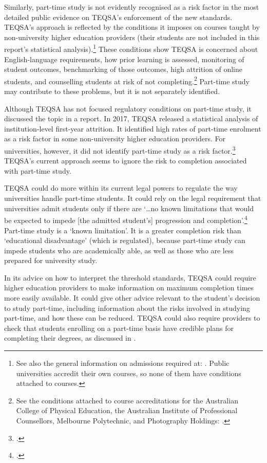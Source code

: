 Similarly, part-time study is not evidently recognised as a risk factor in the most detailed public evidence on TEQSA's enforcement of the new standards. TEQSA's approach is reflected by the conditions it imposes on courses taught by non-university higher education providers (their students are not included in this report's statistical analysis).\footnote{See also the general information on admissions required at: \textcite[][6--7]{TEQSA2017b}. Public universities accredit their own courses, so none of them have conditions attached to courses.} 
These conditions show TEQSA is concerned about English-language requirements, how prior learning is assessed, monitoring of student outcomes, benchmarking of those outcomes, high attrition of online students, and counselling students at risk of not completing.\footnote{See the conditions attached to course accreditations for the Australian College of Physical Education, the Australian Institute of Professional Counsellors, Melbourne Polytechnic, and Photography Holdings: \textcite[][]{TEQSA2017c}.} Part-time study may contribute to these problems, but it is not separately identified.

Although TEQSA has not focused regulatory conditions on part-time study, it discussed the topic in a report. In 2017, TEQSA released a statistical analysis of institution-level first-year attrition. It identified high rates of part-time enrolment as a risk factor in some non-university higher education providers. For universities, however, it did not identify part-time study as a risk factor.\footcite[][19--23]{TEQSA2016e} 
TEQSA's current approach seems to ignore the risk to completion associated with part-time study.

TEQSA could do more within its current legal powers to regulate the way universities handle part-time students. It could rely on the legal requirement that universities admit students only if there are `\ldots{}no known limitations that would be expected to impede {[}the admitted student's{]} progression and completion'.\footcite[][3]{DepartmentofEducationandTraining2015n}
Part-time study is a `known limitation'. It is a greater completion risk than `educational disadvantage' (which is regulated), because part-time study can impede students who are academically able, as well as those who are less prepared for university study.

In its advice on how to interpret the threshold standards, TEQSA could require higher education providers to make information on maximum completion times more easily available. It could give other advice relevant to the student's decision to study part-time, including information about the risks involved in studying part-time, and how these can be reduced. TEQSA could also require providers to check that students enrolling on a part-time basis have credible plans for completing their degrees, as discussed in .

